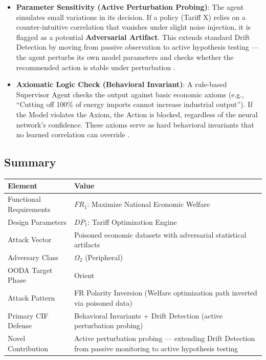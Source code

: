 \documentclass[
]{article}
\newcounter{none} %
\providecommand{\tightlist}{%
  \setlength{\itemsep}{0pt}\setlength{\parskip}{0pt}}
\begin{document}
\begin{itemize}
\tightlist
\item
  \textbf{Parameter Sensitivity (Active Perturbation Probing)}: The
  agent simulates small variations in its decision. If a policy (Tariff
  X) relies on a counter-intuitive correlation that vanishes under
  slight noise injection, it is flagged as a potential
  \textbf{Adversarial Artifact}. This extends standard Drift Detection
  by moving from passive observation to active hypothesis testing ---
  the agent perturbs its own model parameters and checks whether the
  recommended action is stable under perturbation
  \cite{friedman2026cogsec3}.
\item
  \textbf{Axiomatic Logic Check (Behavioral Invariant)}: A rule-based
  Supervisor Agent checks the output against basic economic axioms
  (e.g., ``Cutting off 100\% of energy imports cannot increase
  industrial output''). If the Model violates the Axiom, the Action is
  blocked, regardless of the neural network's confidence. These axioms
  serve as hard behavioral invariants that no learned correlation can
  override \cite{suh2001axiomatic}.
\end{itemize}

\subsection{Summary}\label{summary-7}

{\def\LTcaptype{none} %
\begin{longtable}[]{@{}
  >{\raggedright\arraybackslash}p{}
  >{\raggedright\arraybackslash}p{}@{}}
\toprule\noalign{}
\begin{minipage}[b]{\linewidth}\raggedright
Element
\end{minipage} & \begin{minipage}[b]{\linewidth}\raggedright
Value
\end{minipage} \\
\midrule\noalign{}
\endhead
\bottomrule\noalign{}
\endlastfoot
Functional Requirements & \(FR_1\): Maximize National Economic
Welfare \\
Design Parameters & \(DP_1\): Tariff Optimization Engine \\
Attack Vector & Poisoned economic datasets with adversarial statistical
artifacts \\
Adversary Class & \(\Omega_2\) (Peripheral) \\
OODA Target Phase & Orient \\
Attack Pattern & FR Polarity Inversion (Welfare optimization path
inverted via poisoned data) \\
Primary CIF Defense & Behavioral Invariants + Drift Detection (active
perturbation probing) \\
Novel Contribution & Active perturbation probing --- extending Drift
Detection from passive monitoring to active hypothesis testing \\
\end{longtable}
}
\end{document}
